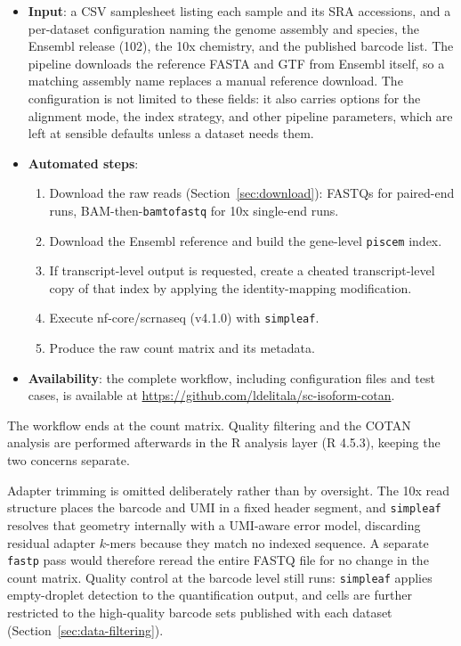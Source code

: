 \begin{itemize}
    \item \textbf{Input}: a CSV samplesheet listing each sample and its SRA accessions, and a per-dataset configuration naming the genome assembly and species, the Ensembl release (102), the 10x chemistry, and the published barcode list. The pipeline downloads the reference FASTA and GTF from Ensembl itself, so a matching assembly name replaces a manual reference download. The configuration is not limited to these fields: it also carries options for the alignment mode, the index strategy, and other pipeline parameters, which are left at sensible defaults unless a dataset needs them.
    \item \textbf{Automated steps}:
    \begin{enumerate}
        \item Download the raw reads (Section~\ref{sec:download}): FASTQs for paired-end runs, BAM-then-\texttt{bamtofastq} for 10x single-end runs.
        \item Download the Ensembl reference and build the gene-level \texttt{piscem} index.
        \item If transcript-level output is requested, create a cheated transcript-level copy of that index by applying the identity-mapping modification.
        \item Execute nf-core/scrnaseq (v4.1.0) with \texttt{simpleaf}.
        \item Produce the raw count matrix and its metadata.
    \end{enumerate}
    \item \textbf{Availability}: the complete workflow, including configuration files and test cases, is available at \url{https://github.com/ldelitala/sc-isoform-cotan}.
\end{itemize}

The workflow ends at the count matrix. Quality filtering and the COTAN analysis are performed afterwards in the R analysis layer (R 4.5.3), keeping the two concerns separate.

Adapter trimming is omitted deliberately rather than by oversight. The 10x read structure places the barcode and UMI in a fixed header segment, and \texttt{simpleaf} resolves that geometry internally with a UMI-aware error model, discarding residual adapter $k$-mers because they match no indexed sequence. A separate \texttt{fastp} pass would therefore reread the entire FASTQ file for no change in the count matrix. Quality control at the barcode level still runs: \texttt{simpleaf} applies empty-droplet detection to the quantification output, and cells are further restricted to the high-quality barcode sets published with each dataset (Section~\ref{sec:data-filtering}).

